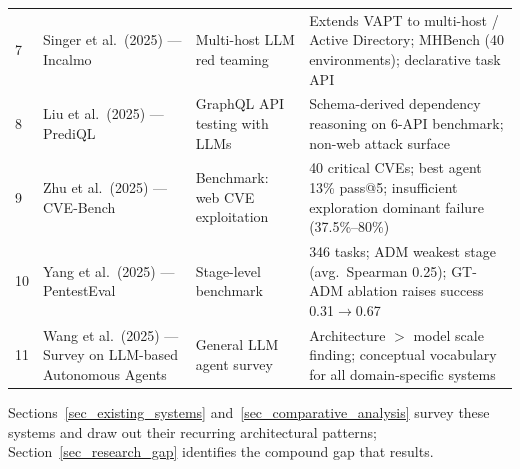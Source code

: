 \begin{table}[htbp]
\begin{tabular}{@{}p{0.4cm}p{4.5cm}p{3.8cm}p{4.5cm}@{}}
		7            & Singer et al.\ (2025) --- Incalmo \citep{singer2025incalmo}                                                & Multi-host LLM red teaming                & Extends VAPT to multi-host / Active Directory; MHBench (40 environments); declarative task API                            \\
		8            & Liu et al.\ (2025) --- PrediQL \citep{liu2025prediql}                                                      & GraphQL API testing with LLMs             & Schema-derived dependency reasoning on 6-API benchmark; non-web attack surface                                            \\
		9            & Zhu et al.\ (2025) --- CVE-Bench \citep{zhu2025cvebench}                                                   & Benchmark: web CVE exploitation           & 40 critical CVEs; best agent 13\% pass@5; insufficient exploration dominant failure (37.5\%--80\%)                        \\
		10           & Yang et al.\ (2025) --- PentestEval \citep{yang2025pentesteval}                                            & Stage-level benchmark                     & 346 tasks; ADM weakest stage (avg.\ Spearman 0.25); GT-ADM ablation raises success 0.31$\to$0.67                          \\
		11           & Wang et al.\ (2025) --- Survey on LLM-based Autonomous Agents \citep{wang2025surveyagents}                 & General LLM agent survey                  & Architecture $>$ model scale finding; conceptual vocabulary for all domain-specific systems                               \\
		\bottomrule
	\end{tabular}
\end{table}

Sections~\ref{sec_existing_systems} and~\ref{sec_comparative_analysis} survey these systems and draw out their recurring architectural patterns; Section~\ref{sec_research_gap} identifies the compound gap that results.
